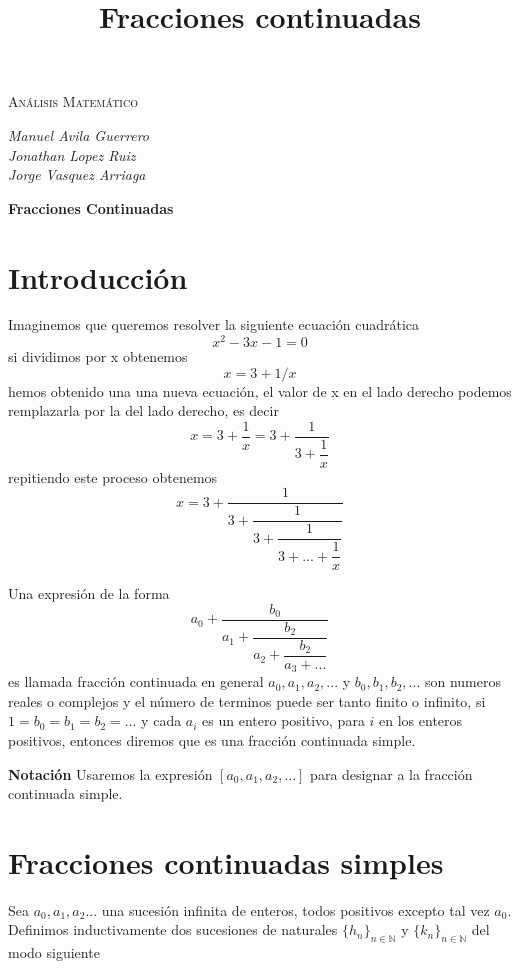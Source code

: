 \documentclass[11pt, article]{article}
\title{Fracciones continuadas}
\author{}
\date{}
\begin{document}
    \begin{center}
    {\scshape\LARGE Análisis Matemático \par}

    \vspace{0.5cm}
    \large{\itshape{Manuel Avila Guerrero}}  \\ 
    \large{\itshape{Jonathan Lopez Ruiz}}  \\
    \large{\itshape{Jorge Vasquez Arriaga}} \\

    {\LARGE \textbf{Fracciones Continuadas} \par}
    \end{center}


\section*{Introducción}
    Imaginemos que queremos resolver la siguiente ecuación cuadrática 
        \[
        x^2 -3x-1=0
        \]
    si dividimos por x obtenemos 
        \[
        x = 3 + 1/x
        \]
    hemos obtenido una una nueva ecuación, el valor de x en el lado derecho podemos remplazarla por la del lado derecho, es decir 
    \[
    x=3+\dfrac{1}{x}=3+\dfrac{1}{3+\dfrac{1}{x}}
    \]
    repitiendo este proceso obtenemos
    \[
    x=3+\dfrac{1}{3 + \dfrac{1}{3 + \dfrac{1}{3 + ... + \dfrac{1}{x}}}}
    \]
    
    Una expresión de la forma 
    \[
    a_0 + \dfrac{b_0}{a_1+ \dfrac{b_2}{a_2+\dfrac{b_2}{a_3+...}}} 
    \]
    es llamada fracción continuada en general $a_0, a_1,a_2,...$ y $b_0, b_1,b_2,...$ son numeros reales o complejos y el número de terminos puede ser tanto finito o infinito, si $1=b_0=b_1=b_2=...$ y cada $a_i$ es un entero positivo, para $i$ en los enteros positivos, entonces diremos que es una fracción continuada simple.
    
    \textbf{Notación} Usaremos la expresión $[a_0,a_1,a_2, \dots]$ para designar a la fracción continuada simple.
    
\section*{Fracciones continuadas simples}
    
    
    Sea $a_0,a_1,a_2...$ una sucesión infinita de enteros, todos positivos excepto tal vez $a_0$. Definimos inductivamente dos sucesiones de naturales $\{h_n\}_{n\in\mathbb{N}}$ y $\{k_n\}_{n\in\mathbb{N}}$ del modo siguiente 
    
\end{document}
